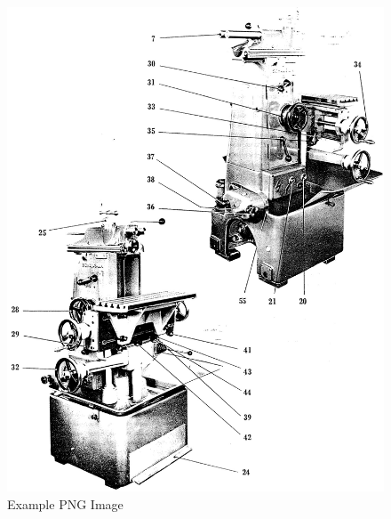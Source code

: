 \newpage
\begin{figure}[h]
    \centering
    \includegraphics[width=1.0\linewidth]{./images/page_18}
    \caption{Example PNG Image}
    \label{fig:speeds_and_feeds_controls}
\end{figure}
